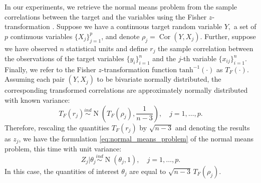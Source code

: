 \documentclass[a4]{article}
\theoremstyle{definition}
\DeclareMathOperator{\Cor}{Cor}
\DeclareMathOperator{\N}{N}
\begin{document}
In our experiments, we retrieve the normal means problem from the
sample correlations between the target and the variables using the
Fisher $z$-transformation \citep{hawkins1989using}. Suppose we have a
continuous target random variable $Y,$ a set of $p$ continuous
variables $\{X_{j}\}_{j=1}^{p}$, and denote
$\rho_{j}=\Cor(Y,X_{j})$. Further, suppose we have observed $n$
statistical units and define $r_{j}$ the sample correlation between
the observations of the target variables $\{y_{i}\}_{i=1}^{n}$ and the
$j$-th variable $\{x_{ij}\}_{i=1}^{n}$. Finally, we refer to the
Fisher $z$-transformation function $\text{tanh}^{-1}(\cdot)$ as
$T_{F}(\cdot)$. Assuming each pair $(Y,X_{j})$ to be bivariate
normally distributed, the corresponding transformed correlations are
approximately normally distributed with known variance: \
\begin{equation} \label{eq:fisher_transformation}
T_{F}(r_{j})\overset{ind}{\sim} \N\left(T_{F}(\rho_{j}),\frac{1}{n-3}\right), \quad j=1,\ldots,p.
\end{equation}
Therefore, rescaling the quantities $T_{F}(r_{j})$ by $\sqrt{n-3}$ and
denoting the results as $z_{j}$, we have the formulation
\eqref{eq:normal_means_problem} of the normal means problem, this time
with unit variance: \
\begin{equation} \label{eq:normal_means_problem2}
Z_{j}|\theta_{j}\overset{ind}{\sim}\N(\theta_{j},1), \quad j=1,\ldots,p.
\end{equation}
In this case, the quantities of interest $\theta_{j}$ are equal to
$\sqrt{n-3}\,T_{F}(\rho_{j})$.
\end{document}
